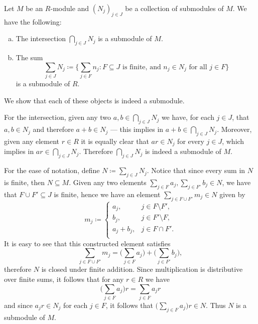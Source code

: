 \begin{example}
\label{exp:intersection-sum-submodules}
Let \(M\) be an \(R\)-module and \((N_j)_{j \in J}\) be a collection of
submodules of \(M\). We have the following:
\begin{enumerate}[(a)]\setlength\itemsep{0em}
\item The intersection \(\bigcap_{j \in J} N_j\) is a submodule of \(M\).
\item The sum
  \[
  \sum_{j \in J} N_j \coloneq \bigg\{
  \sum_{j \in F} n_j \colon F \subseteq J
  \text{ is finite, and } n_j \in N_j \text{ for all } j \in F
  \bigg\}
  \]
  is a submodule of \(R\).
\end{enumerate}
We show that each of these objects is indeed a submodule.

For the intersection, given any two \(a, b \in \bigcap_{j \in J} N_j\) we have,
for each \(j \in J\), that \(a, b \in N_j\) and therefore \(a + b \in N_j\) ---
this implies in \(a + b \in \bigcap_{j \in J} N_j\). Moreover, given any element
\(r \in R\) it is equally clear that \(a r \in N_j\) for every \(j \in J\),
which implies in \(a r \in \bigcap_{j \in J} N_j\). Therefore
\(\bigcap_{j \in J} N_j\) is indeed a submodule of \(M\).

For the ease of notation, define \(N \coloneq \sum_{j \in J} N_j\). Notice that
since every sum in \(N\) is finite, then \(N \subseteq M\). Given any two
elements \(\sum_{j \in F} a_j, \sum_{j \in F'} b_j \in N\), we have that
\(F \cup F' \subseteq J\) is finite, hence we have an element
\(\sum_{j \in F \cup F'} m_j \in N\) given by
\[
m_j \coloneq
\begin{cases}
  a_j,  &j \in F \setminus F', \\
  b_j, &j \in F' \setminus F, \\
  a_j + b_j, &j \in F \cap F'. \\
\end{cases}
\]
It is easy to see that this constructed element satisfies
\[
\sum_{j \in F \cup F'} m_j =
\bigg( \sum_{j \in F} a_j \bigg) +
\bigg( \sum_{j \in F'} b_j \bigg),
\]
therefore \(N\) is closed under finite addition. Since multiplication is
distributive over finite sums, it follows that for any \(r \in R\) we have
\[
\bigg( \sum_{j \in F} a_j \bigg) r = \sum_{j \in F} a_j r
\]
and since \(a_j r \in N_j\) for each \(j \in F\), it follows that
\(\big( \sum_{j \in F} a_j \big) r \in N\). Thus \(N\) is a submodule of
\(M\).
\end{example}

